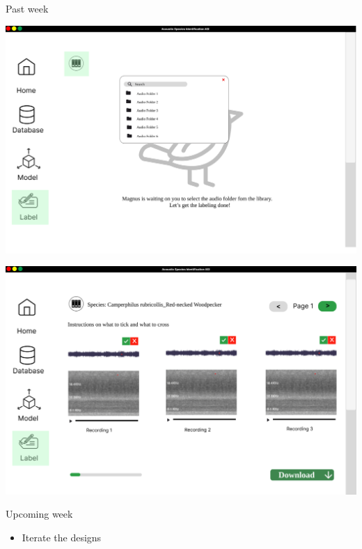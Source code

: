 \begin{frame}{Past week} 
    \begin{minipage}[b]{0.45\textwidth}
        \centering
        \includegraphics[width=\textwidth]{sampleui4.png}  
    \end{minipage}%
    \hspace{0.05\textwidth}
    \begin{minipage}[b]{0.45\textwidth}
        \centering
        \includegraphics[width=\textwidth]{sampleui3.png}  
    \end{minipage}
\end{frame}

\begin{frame}{Upcoming week} 
    \begin{itemize}
        \item Iterate the designs 
    \end{itemize}  
\end{frame}
